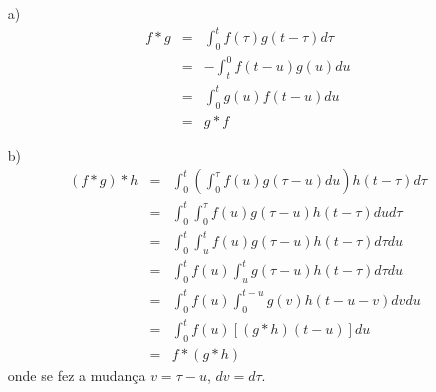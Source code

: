 \begin{resp}
\begin{itemize}
  \item[a)] 
  \begin{eqnarray*}
   f\ast g&=&\int_0^t f(\tau)g(t-\tau)d\tau\\
   &=&-\int_t^0 f(t-u)g(u)du\\
   &=&\int_0^t g(u)f(t-u)du\\
   &=&g\ast f
  \end{eqnarray*}
  \item[b)] 
    \begin{eqnarray*}
   (f\ast g)\ast h&=& \int_0^t \left(\int_0^\tau f(u) g(\tau-u) du \right) h(t-\tau) d\tau \\
   &=& \int_0^t \int_0^\tau f(u) g(\tau-u) h(t-\tau) du d\tau \\
   &=& \int_0^t \int_u^t f(u) g(\tau-u) h(t-\tau)  d\tau du \\
   &=& \int_0^t f(u) \int_u^t g(\tau-u) h(t-\tau)  d\tau du \\
   &=& \int_0^t f(u) \int_0^{t-u} g(v) h(t-u-v)  dv du \\
   &=& \int_0^t f(u) \left[(g\ast h)(t-u)\right]  du \\
   &=&f \ast (g \ast h)
  \end{eqnarray*}
  onde se fez a mudança $v=\tau-u$, $dv=d\tau$.
\end{itemize}
\end{resp}

